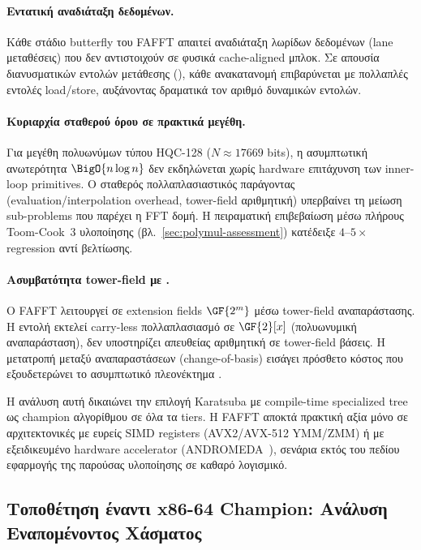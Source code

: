 \paragraph{Εντατική αναδιάταξη δεδομένων.}
Κάθε στάδιο butterfly του FAFFT απαιτεί αναδιάταξη λωρίδων δεδομένων (lane
μεταθέσεις) που δεν αντιστοιχούν σε φυσικά cache-aligned μπλοκ. Σε
απουσία διανυσματικών εντολών μετάθεσης (), κάθε ανακατανομή
επιβαρύνεται με πολλαπλές εντολές load/store, αυξάνοντας δραματικά τον
αριθμό δυναμικών εντολών.

\paragraph{Κυριαρχία σταθερού όρου σε πρακτικά μεγέθη.}
Για μεγέθη πολυωνύμων τύπου HQC-128 ($N \approx \num{17669}$ bits), η
ασυμπτωτική ανωτερότητα $\BigO{n \log n}$ δεν εκδηλώνεται χωρίς
hardware επιτάχυνση των inner-loop primitives. Ο σταθερός
πολλαπλασιαστικός παράγοντας (evaluation/interpolation overhead, tower-field
αριθμητική) υπερβαίνει τη μείωση sub-problems που παρέχει η FFT δομή.
Η πειραματική επιβεβαίωση μέσω πλήρους Toom-Cook~3 υλοποίησης
(βλ.\ \cref{sec:polymul-assessment}) κατέδειξε $4$–$5\times$ regression
αντί βελτίωσης.

\paragraph{Ασυμβατότητα tower-field με \vclmul.}
Ο FAFFT λειτουργεί σε extension fields $\GF{2^m}$ μέσω tower-field
αναπαράστασης. Η εντολή \vclmul εκτελεί carry-less πολλαπλασιασμό σε
$\GF{2}[x]$ (πολυωνυμική αναπαράσταση), δεν υποστηρίζει απευθείας
αριθμητική σε tower-field βάσεις. Η μετατροπή μεταξύ αναπαραστάσεων
(change-of-basis) εισάγει πρόσθετο κόστος που εξουδετερώνει το
ασυμπτωτικό πλεονέκτημα \cite{Chen2026-TCHES-HQC-FFT}.

Η ανάλυση αυτή δικαιώνει την επιλογή Karatsuba με compile-time specialized tree ως champion αλγορίθμου
σε όλα τα tiers. Η FAFFT αποκτά πρακτική αξία μόνο σε αρχιτεκτονικές με
ευρείς SIMD registers (AVX2/AVX-512 YMM/ZMM) ή με εξειδικευμένο hardware accelerator
(ANDROMEDA~\cite{ras-nist2025}), σενάρια εκτός του πεδίου εφαρμογής
της παρούσας υλοποίησης σε καθαρό λογισμικό.

\subsection{Τοποθέτηση έναντι x86-64 Champion: Ανάλυση Εναπομένοντος Χάσματος}
\label{ssec:avx2-gap}

